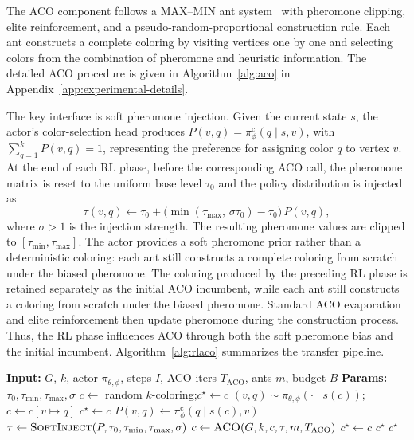 The ACO component follows a MAX--MIN ant system~\cite{stutzle2000maxmin} with pheromone clipping, elite reinforcement, and a pseudo-random-proportional construction rule. Each ant constructs a complete coloring by visiting vertices one by one and selecting colors from the combination of pheromone and heuristic information. The detailed ACO procedure is given in Algorithm~\ref{alg:aco} in Appendix~\ref{app:experimental-details}.

The key interface is soft pheromone injection. Given the current state $s$, the actor's color-selection head produces
$P(v,q)=\pi^{\mathrm{c}}_\phi(q\mid s,v)$, with
$\sum_{q=1}^{k}P(v,q)=1$, representing the preference for assigning color $q$ to vertex $v$. At the end of each RL phase, before the corresponding ACO call, the pheromone matrix is reset to the uniform base level $\tau_0$ and the policy distribution is injected as
\begin{equation}
  \tau(v,q)
  \leftarrow
  \tau_0 +
  \bigl(\min(\tau_{\max},\, \sigma\tau_0) - \tau_0\bigr)\,
  P(v,q),
  \label{eq:soft}
\end{equation}
where $\sigma>1$ is the injection strength. The resulting pheromone values are clipped to $[\tau_{\min},\tau_{\max}]$. The actor provides a soft pheromone prior rather than a deterministic
coloring: each ant still constructs a complete coloring from scratch under
the biased pheromone. The coloring produced by the preceding RL phase is
retained separately as the initial ACO incumbent, while each ant still constructs a coloring from scratch under the biased
pheromone. Standard ACO evaporation and elite reinforcement then update
pheromone during the construction process.
Thus, the RL phase influences ACO through both the soft
pheromone bias and the initial incumbent. Algorithm~\ref{alg:rlaco} summarizes the transfer pipeline.

\begin{algorithm}[t]
\caption{The RLACO pipeline}
\label{alg:rlaco}
\begin{algorithmic}[1]
\State \textbf{Input:} $G$, $k$, actor $\pi_{\theta,\phi}$, steps $I$,
ACO iters $T_{\mathrm{ACO}}$, ants $m$, budget $B$
\State \textbf{Params:} $\tau_0,\tau_{\min},\tau_{\max},\sigma$
\State $c\leftarrow$ random $k$-coloring;\quad $c^\star\leftarrow c$
    \State $(v,q)\sim\pi_{\theta,\phi}(\cdot\mid s(c))$;\quad $c\leftarrow c[v\mapsto q]$
     \State $c^\star\leftarrow c$ \EndIf
  \EndFor
  \State $P(v,q)\leftarrow\pi^{\mathrm{c}}_\phi(q\mid s(c),v)$
  \State $\tau\leftarrow\textsc{SoftInject}(P,\tau_0,\tau_{\min},\tau_{\max},\sigma)$
  \State $c\leftarrow\textsc{ACO}(G,k,c,\tau,m,T_{\mathrm{ACO}})$
   \State $c^\star\leftarrow c$ \EndIf
   \State \Return $c^\star$ \EndIf
\EndWhile
\State \Return $c^\star$
\end{algorithmic}
\end{algorithm}

